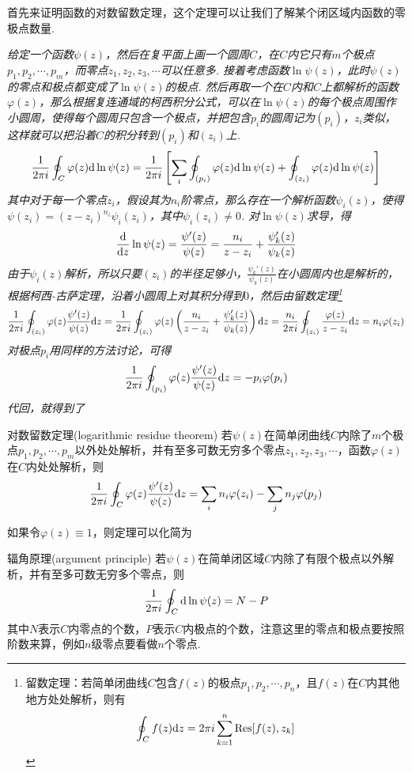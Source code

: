 \documentclass[main.tex]{subfiles}
\begin{document}
首先来证明函数的对数留数定理，这个定理可以让我们了解某个闭区域内函数的零极点数量.

\textit{
给定一个函数\(\psi(z)\)，然后在复平面上画一个圆周\(C\)，在\(C\)内它只有\(m\)个极点\(p_1, p_2, \cdots, p_m\)，而零点\(z_1, z_2, z_3, \cdots\)可以任意多. 接着考虑函数\(\ln\psi(z)\)，此时\(\psi(z)\)的零点和极点都变成了\(\ln\psi(z)\)的极点. 然后再取一个在\(C\)内和\(C\)上都解析的函数\(\varphi(z)\)，那么根据复连通域的柯西积分公式，可以在\(\ln\psi(z)\)的每个极点周围作小圆周，使得每个圆周只包含一个极点，并把包含\(p_i\)的圆周记为\((p_i)\)，\(z_i\)类似，这样就可以把沿着\(C\)的积分转到\((p_i)\)和\((z_i)\)上.
\[\frac{1}{2\pi i}\oint_{C}\varphi(z){\rm d}\ln\psi(z) = \frac{1}{2\pi i}\left[\sum_{i}\oint_{(p_i)}\varphi(z){\rm d}\ln\psi(z)+\oint_{(z_i)}\varphi(z){\rm d}\ln\psi(z)\right]\]
其中对于每一个零点\(z_i\)，假设其为\(n_i\)阶零点，那么存在一个解析函数\(\psi_i(z)\)，使得\(\psi(z_i) = (z-z_i)^{n_i}\psi_i(z_i)\)，其中\(\psi_i(z_i)\neq 0\). 对\(\ln\psi(z)\)求导，得
\[\frac{{\rm d}}{{\rm d}z}\ln\psi(z) = \frac{\psi'(z)}{\psi(z)} = \frac{n_i}{z-z_i}+\frac{\psi_k'(z)}{\psi_k(z)}\]
由于\(\psi_i(z)\)解析，所以只要\((z_i)\)的半径足够小，\(\frac{\psi_k'(z)}{\psi_k(z)}\)在小圆周内也是解析的，根据柯西-古萨定理，沿着小圆周上对其积分得到\(0\)，然后由留数定理\footnote{留数定理：若简单闭曲线\(C\)包含\(f(z)\)的极点\(p_1, p_2, \cdots, p_n\)，且\(f(z)\)在\(C\)内其他地方处处解析，则有
\[\oint_C f(z){\rm d}z = 2\pi i\sum_{k=1}^{n}{\rm Res}[f(z),z_k]\]}
\[\frac{1}{2\pi i}\oint_{(z_i)}\varphi(z)\frac{\psi'(z)}{\psi(z)}{\rm d}z = \frac{1}{2\pi i}\oint_{(z_i)}\varphi(z)\left(\frac{n_i}{z-z_i}+\frac{\psi_k'(z)}{\psi_k(z)}\right){\rm d}z = \frac{n_i}{2\pi i}\oint_{(z_i)}\frac{\varphi(z)}{z-z_i}{\rm d}z = n_i\varphi(z_i)\]
对极点\(p_i\)用同样的方法讨论，可得
\[\frac{1}{2 \pi i}\oint_{(p_i)}\varphi(z)\frac{\psi'(z)}{\psi(z)}{\rm d}z = -p_i\varphi(p_i)\]
代回，就得到了
}
\begin{theorem}{对数留数定理(logarithmic residue theorem)}
    若\(\psi(z)\)在简单闭曲线\(C\)内除了\(m\)个极点\(p_1, p_2, \cdots, p_m\)以外处处解析，并有至多可数无穷多个零点\(z_1, z_2, z_3, \cdots\)，函数\(\varphi(z)\)在\(C\)内处处解析，则
    \[\frac{1}{2\pi i}\oint_{C}\varphi(z)\frac{\psi'(z)}{\psi(z)}{\rm d}z = \sum_{i}n_i\varphi(z_i) - \sum_{j}n_j\varphi(p_j)\]
\end{theorem}
如果令\(\varphi(z) \equiv 1\)，则定理可以化简为
\begin{theorem}{辐角原理(argument principle)}
    若\(\psi(z)\)在简单闭区域\(C\)内除了有限个极点以外解析，并有至多可数无穷多个零点，则
    \[\frac{1}{2\pi i}\oint_{C}{\rm d}\ln\psi(z) = N-P\]
    其中\(N\)表示\(C\)内零点的个数，\(P\)表示\(C\)内极点的个数，注意这里的零点和极点要按照阶数来算，例如\(n\)级零点要看做\(n\)个零点.
\end{theorem}
\end{document}
